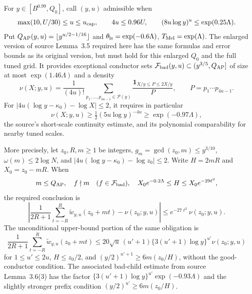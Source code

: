 For $y\in[B^{0.99},Q_0]$, call $(y,u)$ admissible when
\[
 \max(10,U/30)\le u\le u_{\rm cap},\qquad
 4u\le0.96U,\qquad (8u\log y)^u\le\exp(0.25\Lambda).
\]
Put $Q_{\rm AP}(y,u)=\lfloor y^{u/2-1/16}\rfloor$ and
$\theta_{\rm ls}=\exp(-0.6\Lambda)$,
$T_{\rm Mel}=\exp(\Lambda)$.
The enlarged version of source Lemma~3.5 required here has the
same formulas and error bounds as its original version, but must
hold for this enlarged $Q_0$ and the full tuned grid.
It provides exceptional conductor sets
$\mathcal F_{\rm bad}(y,u)\subset(y^{3/5},Q_{\rm AP}]$ of size at
most $\exp(1.46\Lambda)$ and a density
\begin{equation}
 \nu(X;y,u)=\frac1{(4u)!}
 \sum_{p_1,\ldots,p_{4u-1}\in\mathcal P(y)}
 \frac{\boldsymbol1_{X/y\le P\le2X/y}}P,
 \qquad P=p_1\cdots p_{4u-1}.
 \label{rf:density}
\end{equation}
For $|4u(\log y-\kappa_0)-\log X|\le2$, it requires in particular
\begin{equation}
 \nu(X;y,u)\ge\tfrac12(5u\log y)^{-4u}
                  \ge\exp(-0.97\Lambda),
 \label{rf:densitylower}
\end{equation}
the source's short-scale continuity estimate, and its polynomial
comparability for nearby tuned scales.

More precisely, let $z_0,R,m\ge1$ be integers,
$g_m=\gcd(z_0,m)\le y^{3/10}$,
$\omega(m)\le2\log N$, and
$|4u(\log y-\kappa_0)-\log z_0|\le2$.
Write $H=2mR$ and $X_0=z_0-mR$.  When
\begin{equation}
 m\le Q_{\rm AP},\quad
 f\nmid m\quad(f\in\mathcal F_{\rm bad}),\quad
 X_0e^{-0.2\Lambda}\le H\le X_0e^{-29\ell^2},
 \label{rf:apconditions}
\end{equation}
the required conclusion is
\begin{equation}
 \left|\frac1{2R+1}\sum_{t=-R}^R
       \widetilde w_{y,u}(z_0+mt)-\nu(z_0;y,u)\right|
 \le e^{-27\ell^2}\nu(z_0;y,u).
 \label{rf:apclaim}
\end{equation}
The unconditional upper-bound portion of the same obligation is
\begin{equation}
 \frac1{2R+1}\sum_{t=-R}^R\widetilde w_{y,u}(z_0+mt)
 \le20\sqrt u\,(u'+1)\{3(u'+1)\log y\}^{u'}\nu(z_0;y,u)
 \label{rf:roughclaim}
\end{equation}
for $1\le u'\le2u$, $H\le z_0/2$, and
$(y/2)^{u'+1}\ge6m(z_0/H)$, without the good-conductor
condition.  The associated bad-child estimate from source
Lemma~3.6(3) has the factor
$\{3(u'+1)\log y\}^{u'}\exp(-0.93\Lambda)$ and the slightly
stronger prefix condition $(y/2)^{u'}\ge6m(z_0/H)$.

